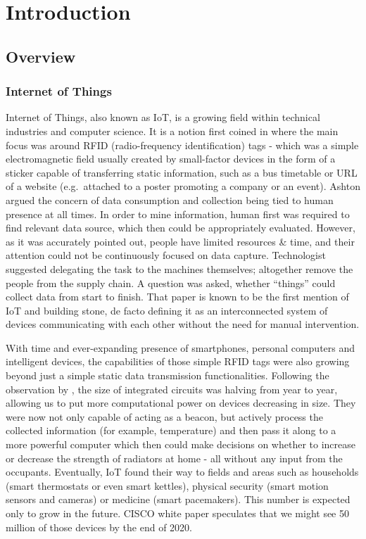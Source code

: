 \chapter{Introduction\label{chap:introduction}}

\section{Overview}
\subsection{Internet of Things}
Internet of Things, also known as IoT, is a growing field within technical industries and computer science. It is a notion first coined in \citet{ashton1999introduction} where the main focus was around RFID (radio-frequency identification) tags - which was a simple electromagnetic field usually created by small-factor devices in the form of a sticker capable of transferring static information, such as a bus timetable or URL of a website (e.g.\ attached to a poster promoting a company or an event). Ashton argued the concern of data consumption and collection being tied to human presence at all times. In order to mine information, human first was required to find relevant data source, which then could be appropriately evaluated. However, as it was accurately pointed out, people have limited resources \& time, and their attention could not be continuously focused on data capture. Technologist suggested delegating the task to the machines themselves; altogether remove the people from the supply chain. A question was asked, whether ``things'' could collect data from start to finish. That paper is known to be the first mention of IoT and building stone, de facto defining it as an interconnected system of devices communicating with each other without the need for manual intervention.

With time and ever-expanding presence of smartphones, personal computers and intelligent devices, the capabilities of those simple RFID tags were also growing beyond just a simple static data transmission functionalities. Following the observation by \citet{moore1965cramming}, the size of integrated circuits was halving from year to year, allowing us to put more computational power on devices decreasing in size. They were now not only capable of acting as a beacon, but actively process the collected information (for example, temperature) and then pass it along to a more powerful computer which then could make decisions on whether to increase or decrease the strength of radiators at home - all without any input from the occupants. Eventually, IoT found their way to fields and areas such as households (smart thermostats or even smart kettles), physical security (smart motion sensors and cameras) or medicine (smart pacemakers). This number is expected only to grow in the future. CISCO white paper \cite{evans2011internet} speculates that we might see 50 million of those devices by the end of 2020.

